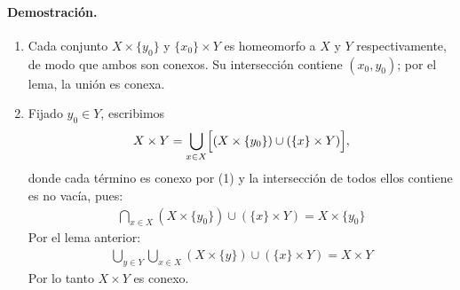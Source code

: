 \paragraph{\textbf{Demostración.}}
\begin{enumerate}
  \item Cada conjunto $X\times\{y_0\}$ y $\{x_0\}\times Y$ es homeomorfo a $X$ y $Y$ respectivamente, de modo que ambos son conexos.  
        Su intersección contiene $(x_0,y_0)$; por el lema, la unión es conexa.
  \item Fijado $y_0\in Y$, escribimos
        \begin{align*}
        X\times Y=\bigcup_{x\in X}\Bigl[(X\times\{y_0\})\cup(\{x\}\times Y)\Bigr],
        \end{align*}
        donde cada término es conexo por (1) y la intersección de todos ellos contiene es no vacía, pues:
        \begin{align*}
          \bigcap_{x \in X} (X \times \{y_0\}) \cup (\{x\} \times Y)= X \times \{y_0\} 
        \end{align*}
        Por el lema anterior:
        \begin{align*}
          \bigcup_{y \in Y} \bigcup_{x \in X} (X \times \{y\}) \cup (\{x\} \times Y) = X \times Y
        \end{align*}
        Por lo tanto $X\times Y$ es conexo. \qedhere
\end{enumerate}

